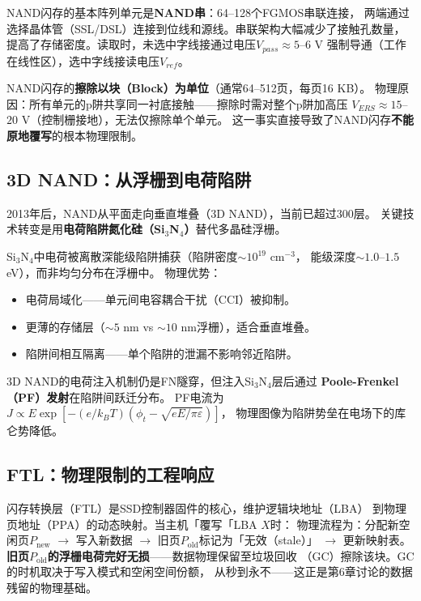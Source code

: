 \documentclass[11pt,a4paper,openany]{book}
\theoremstyle{definition}
\theoremstyle{plain}
\theoremstyle{remark}
\begin{document}
NAND闪存的基本阵列单元是\textbf{NAND串}：64--128个FGMOS串联连接，
两端通过选择晶体管（SSL/DSL）连接到位线和源线。串联架构大幅减少了接触孔数量，
提高了存储密度。读取时，未选中字线接通过电压$V_{pass} \approx 5$--$6$ V
强制导通（工作在线性区），选中字线接读电压$V_{ref}$。

NAND闪存的\textbf{擦除以块（Block）为单位}（通常64--512页，每页16 KB）。
物理原因：所有单元的p阱共享同一衬底接触——擦除时需对整个p阱加高压
$V_{ERS} \approx 15$--$20$ V（控制栅接地），无法仅擦除单个单元。
这一事实直接导致了NAND闪存\textbf{不能原地覆写}的根本物理限制。

\subsection{3D NAND：从浮栅到电荷陷阱}

2013年后，NAND从平面走向垂直堆叠（3D NAND），当前已超过300层。
关键技术转变是用\textbf{电荷陷阱氮化硅（Si$_3$N$_4$）}替代多晶硅浮栅。

Si$_3$N$_4$中电荷被离散深能级陷阱捕获（陷阱密度$\sim 10^{19}$ cm$^{-3}$，
能级深度$\sim 1.0$--$1.5$ eV），而非均匀分布在浮栅中。
物理优势：
\begin{itemize}
  \item 电荷局域化——单元间电容耦合干扰（CCI）被抑制。
  \item 更薄的存储层（$\sim 5$ nm vs $\sim 10$ nm浮栅），适合垂直堆叠。
  \item 陷阱间相互隔离——单个陷阱的泄漏不影响邻近陷阱。
\end{itemize}

3D NAND的电荷注入机制仍是FN隧穿，但注入Si$_3$N$_4$层后通过
\textbf{Poole-Frenkel（PF）发射}在陷阱间跃迁分布。
PF电流为$J \propto E\exp[-(e/k_B T)(\phi_t - \sqrt{eE/\pi\varepsilon})]$，
物理图像为陷阱势垒在电场下的库仑势降低。

\subsection{FTL：物理限制的工程响应}

闪存转换层（FTL）是SSD控制器固件的核心，维护逻辑块地址（LBA）
到物理页地址（PPA）的动态映射。当主机「覆写「LBA $X$时：
物理流程为：分配新空闲页$P_{\text{new}}$ $\to$ 写入新数据 $\to$
旧页$P_{\text{old}}$标记为「无效（stale）」 $\to$ 更新映射表。
\textbf{旧页$P_{\text{old}}$的浮栅电荷完好无损}——数据物理保留至垃圾回收
（GC）擦除该块。GC的时机取决于写入模式和空闲空间份额，
从秒到永不——这正是第6章讨论的数据残留的物理基础。

\end{document}

